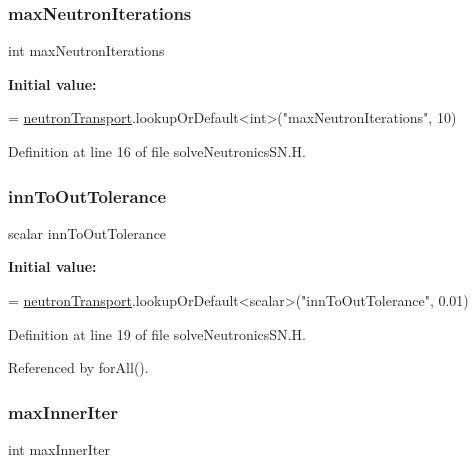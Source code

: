 \subsubsection{\texorpdfstring{max\+Neutron\+Iterations}{maxNeutronIterations}}
{\footnotesize\ttfamily int max\+Neutron\+Iterations}

{\bfseries Initial value\+:}
\begin{DoxyCode}
=
    \hyperlink{solveNeutronics_8H_ac82f3800c6fe7f00c65fbf04d3c1050d}{neutronTransport}.lookupOrDefault<\textcolor{keywordtype}{int}>(\textcolor{stringliteral}{"maxNeutronIterations"}, 10)
\end{DoxyCode}


Definition at line 16 of file solve\+Neutronics\+S\+N.\+H.

\mbox{\label{solveNeutronicsSN_8H_a8c0b13ecc43157dd3e8ea513fe3139a4}} 
\subsubsection{\texorpdfstring{inn\+To\+Out\+Tolerance}{innToOutTolerance}}
{\footnotesize\ttfamily scalar inn\+To\+Out\+Tolerance}

{\bfseries Initial value\+:}
\begin{DoxyCode}
=
    \hyperlink{solveNeutronics_8H_ac82f3800c6fe7f00c65fbf04d3c1050d}{neutronTransport}.lookupOrDefault<scalar>(\textcolor{stringliteral}{"innToOutTolerance"}, 0.01)
\end{DoxyCode}


Definition at line 19 of file solve\+Neutronics\+S\+N.\+H.



Referenced by for\+All().

\mbox{\label{solveNeutronicsSN_8H_a9dc3825181b46ae33ccfa3afd2182700}} 
\subsubsection{\texorpdfstring{max\+Inner\+Iter}{maxInnerIter}}
{\footnotesize\ttfamily int max\+Inner\+Iter}

